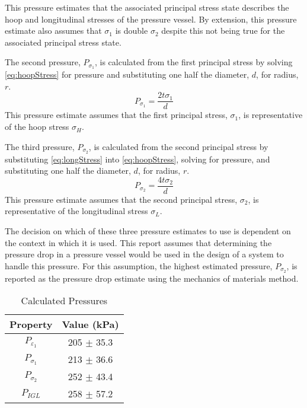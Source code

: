 \documentclass[10pt,journal,letterpaper]{IEEEtran}
\begin{document}
This pressure estimates that the associated principal stress state describes the hoop and longitudinal stresses of the pressure vessel.
By extension, this pressure estimate also assumes that $\sigma_1$ is double $\sigma_2$ despite this not being true for the associated principal stress state.

The second pressure, $P_{\sigma_1}$, is calculated from the first principal stress by solving \eqref{eq:hoopStress} for pressure and substituting one half the diameter, $d$, for radius, $r$.
\begin{equation}
\label{eq:Psig1}
P_{\sigma_1} = \frac{2t\sigma_1}{d}
\end{equation}
This pressure estimate assumes that the first principal stress, $\sigma_1$, is representative of the hoop stress $\sigma_H$.

The third pressure, $P_{\sigma_2}$, is calculated from the second principal stress by substituting \eqref{eq:longStress} into \eqref{eq:hoopStress}, solving for pressure, and substituting one half the diameter, $d$, for radius, $r$.
\begin{equation}
\label{eq:Psig2}
P_{\sigma_2} = \frac{4t\sigma_2}{d}
\end{equation}
This pressure estimate assumes that the second principal stress, $\sigma_2$, is representative of the longitudinal stress $\sigma_L$.

The decision on which of these three pressure estimates to use is dependent on the context in which it is used.
This report assumes that determining the pressure drop in a pressure vessel would be used in the design of a system to handle this pressure.
For this assumption, the highest estimated pressure, $P_{\sigma_2}$, is reported as the pressure drop estimate using the mechanics of materials method.

\begin{table}[H]
\renewcommand\arraystretch{1.25}
\centering
\caption{Calculated Pressures}
\begin{tabular}{cc}
\hline \hline
Property & Value (kPa) \\
\hline
$P_{\varepsilon_1}$ & 205 $\pm$ 35.3 \\
$P_{\sigma_1}$ & 213 $\pm$ 36.6 \\
$P_{\sigma_2}$ & 252 $\pm$ 43.4 \\
$P_{IGL}$ & 258 $\pm$ 57.2 \\
\hline \hline
\end{tabular}
\label{tab:CalcedP}
\end{table}
\end{document}
